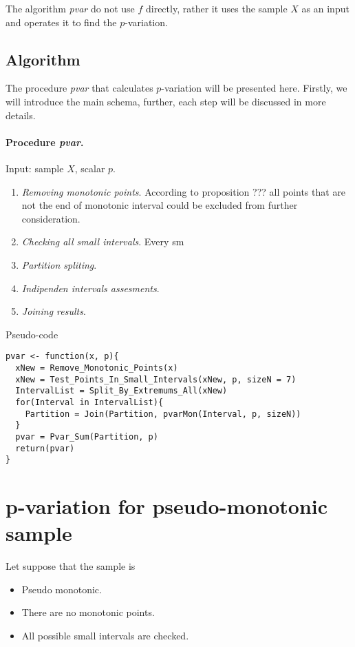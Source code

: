 \documentclass[12pt, a4paper]{article}
\numberwithin{equation}{section}
\begin{document}
The algorithm \emph{pvar} do not use $f$ directly, 
rather it uses the sample $X$ as an input 
and operates it to find the $p$-variation.

\subsection{Algorithm}

The procedure \emph{pvar} that calculates
$p$-variation will be presented here. Firstly,
we will introduce the main schema, further, each step will
be discussed in more details.

\paragraph{Procedure \emph{pvar}.}
Input: sample $X$, scalar $p$.

\begin{enumerate}
  \item \emph{Removing monotonic points}. According to proposition ???
  all points that are not the end of monotonic interval could be excluded 
  from further consideration. 
  
  \item \emph{Checking all small intervals}. Every sm

  \item \emph{Partition spliting}. 
  
  \item \emph{Indipenden intervals assesments}.
  
  \item \emph{Joining results}.  
  
\end{enumerate}

Pseudo-code
\begin{lstlisting}
pvar <- function(x, p){
  xNew = Remove_Monotonic_Points(x) 
  xNew = Test_Points_In_Small_Intervals(xNew, p, sizeN = 7) 
  IntervalList = Split_By_Extremums_All(xNew)
  for(Interval in IntervalList){
    Partition = Join(Partition, pvarMon(Interval, p, sizeN))
  }
  pvar = Pvar_Sum(Partition, p)  
  return(pvar)
}
\end{lstlisting}
  


\section{p-variation for pseudo-monotonic sample}  

Let suppose that the sample is
\begin{itemize}
  \item Pseudo monotonic.
  \item There are no monotonic points.
  \item All possible small intervals are checked.
\end{itemize}
\end{document}
